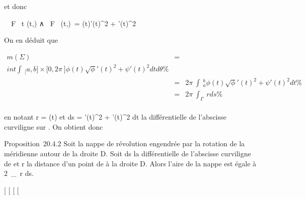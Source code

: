 \documentclass[]{article}
\begin{document}
et donc

\ \partial~F \over \partial~t (t,\theta) ∧ \partial~F
\over \partial~\theta (t,\theta)\ =
\phi(t)\sqrt\phi'(t)^2  +
\psi'(t)^2

On en déduit que

\begin{align*} m(\Sigma)& =& \\int
 \int ~
_{[}a,b{]}\times{[}0,2\pi~{]}\phi(t)\sqrt\phi'(t)^2
 + \psi'(t)^2 dt d\theta\%& \\ &
=& 2\pi~\int ~
_a^b\phi(t)\sqrt\phi'(t)^2
 + \psi'(t)^2 dt \%& \\ &
=& 2\pi~\int  _\Gamma~r ds
\%& \\ \end{align*}

en notant r = \phi(t) et ds = \sqrt\phi'(t)^2  +
\psi'(t)^2 dt la différentielle de l'abscisse curviligne sur
\Gamma. On obtient donc

Proposition~20.4.2 Soit \Sigma la nappe de révolution engendrée par la
rotation de la méridienne \Gamma autour de la droite D. Soit ds la
différentielle de l'abscisse curviligne de \Gamma et r la distance d'un point
de \Gamma à la droite D. Alors l'aire de la nappe est égale à
2\pi~\int  _\Gamma~r ds.

{[}
{[}
{[}
{[}
\end{document}
